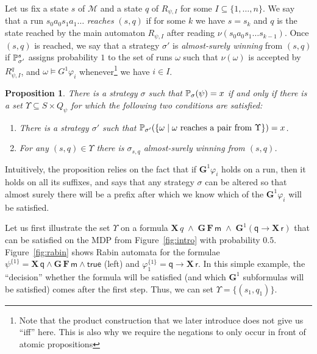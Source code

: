 \documentclass[a4paper,UKenglish]{lipics}
\newcommand{\true}{\mathsf{true}}
\newcommand{\mdp}{\mathcal{M}}
\newcommand{\Gf}[1]{\mathbf{G}^{#1}}
\newcommand{\X}{\mathbf{X}\,}
\newcommand{\G}{\mathbf{G}\,}
\newcommand{\F}{\mathbf{F}\,}
\newcommand{\Prb}[2][]{\ifblank{#1}{\mathbb{P}_{#2}}{\mathbb{P}^{#1}_{#2}}}
\renewcommand{\Pr}[3][]{\ifblank{#1}{\mathbb{P}_{#2}}{\mathbb{P}^{#1}_{#2}}(#3)}
\newcommand{\rabin}{R}
\newcommand{\ap}[1]{\ensuremath{\mathsf{#1}}}
\newtheorem{proposition}[theorem]{\bfseries  Proposition}
\begin{document}
Let us fix a state $s$ of $\mdp$ and a state $q$ of $R_{\psi,I}$ for some $I \subseteq \{1,\ldots,n\}$. We say that a run $s_0a_0s_1a_1\ldots$ \emph{reaches} $(s,q)$ if for some $k$ we have $s = s_k$ and $q$ is the state reached by the main automaton $\rabin_{\psi,I}$ after reading $\nu(s_0a_0s_1\ldots s_{k-1})$. Once $(s,q)$ is reached, we say that a strategy $\sigma'$ is \emph{almost-surely winning} from $(s,q)$ if $\Prb[s]{\sigma'}$ assigns probability $1$ to the set of runs $\omega$ such that $\nu(\omega)$ is accepted by $\rabin_{\psi,I}^q$, and $\omega\models G^{1} \varphi_i$ whenever\footnote{Note that the product construction that we later introduce does not give us ``iff'' here. This is also why we require the negations to only occur in front of atomic propositions} we have $i\in I$.

\begin{proposition}\label{prop:reach}
	There is a strategy $\sigma$ such that $\Pr{\sigma}{\psi}=x$
	if and only if
	there is a set $\Upsilon \subseteq S\times Q_\psi$ for which the following two conditions are satisfied:
	\begin{enumerate}
		\item\label{item:2a} There is a strategy $\sigma'$ such that $\Pr{\sigma'}{\{ \omega \mid \text{$\omega$ reaches a pair from $\Upsilon$} \}} = x$.
		\item\label{item:2b} For any $(s,q) \in \Upsilon$ there is $\sigma_{s,q}$ almost-surely winning from $(s,q)$.
	\end{enumerate}
\end{proposition}

\noindent
Intuitively, the proposition relies on the fact that if $\Gf{1} \varphi_i$ holds on a run, then it holds on all its suffixes, and says that any strategy $\sigma$ can be altered so that almost surely there will be a prefix after which we know which of the $\Gf{1} \varphi_i$ will be satisfied.

\begin{example}\label{ex:upsilon-intuition}
	Let us first illustrate the set $\Upsilon$ on a formula $ \X q \;\land\; \G\F \ap{m} \;\land\; \Gf{1} (\ap{q} \rightarrow \X \ap{r} )$ that can be satisfied on the MDP from Figure~\ref{fig:intro} with probability $0.5$. Figure~\ref{fig:rabin} shows Rabin automata for the formulae
	$\psi^{\{1\}} = \X \ap{q} \land \G\F \ap{m} \land \true$ (left) and $\varphi_1^{\{1\}} = \ap{q} \rightarrow \X\ap{r}$. 
In this simple example, the ``decision'' whether the formula will be satisfied (and which $\Gf{1}$ subformulas will be satisfied) comes after the first step. Thus, we can set $\Upsilon = \{(s_1,q_1)\}$.
\end{example}
\end{document}
